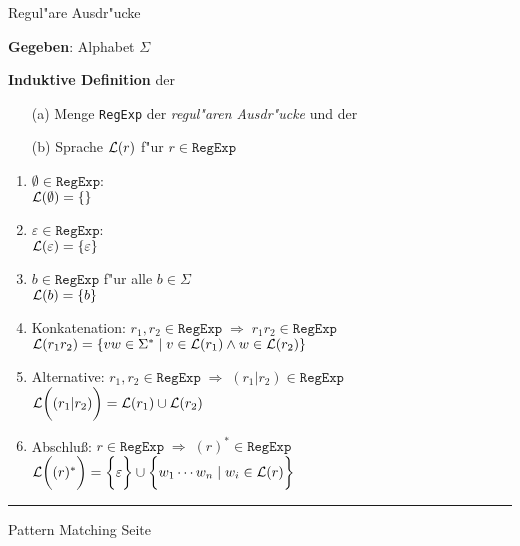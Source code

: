 
\begin{slide}{}
\normalsize

\begin{center}
Regul"are Ausdr"ucke
\end{center}
\vspace*{0.5cm}

\footnotesize
\textbf{Gegeben}: Alphabet $\Sigma$

\textbf{Induktive Definition} der 
\begin{enumerate}
\item[(a)] Menge \texttt{RegExp} der \emph{regul"aren Ausdr"ucke} und der
\item[(b)] Sprache ${\cal L}(r)$ f"ur $r \in \mathtt{RegExp}$
\end{enumerate}
\begin{enumerate}
\item $\emptyset \in \mathtt{RegExp}$: \\[0.3cm]
        \hspace*{1.3cm}  ${\cal L}(\emptyset) = \{ \}$
\item $\varepsilon \in \mathtt{RegExp}$: \\[0.3cm]
      \hspace*{1.3cm}  ${\cal L}(\varepsilon) = \{ \varepsilon \}$
\item $b \in \mathtt{RegExp}$ \quad f"ur alle $b \in \Sigma$ \\[0.3cm]
      \hspace*{1.3cm} ${\cal L}(b) = \{ b \}$
\item Konkatenation:    $r_1, r_2 \in \mathtt{RegExp}  \;\Rightarrow\; r_1r_2 \in \mathtt{RegExp}$ \\[0.3cm]
      \hspace*{1.3cm}  ${\cal L}(r_1r_2) = \{ vw \in \Sigma^* \;|\; v \in {\cal L}(r_1) \wedge w \in {\cal L}(r_2) \}$
\item Alternative: $r_1, r_2 \in \mathtt{RegExp}  \;\Rightarrow\; (r_1|r_2) \in \mathtt{RegExp}$ \\[0.3cm]
      \hspace*{1.3cm}  ${\cal L}\bigg((r_1|r_2)\bigg) = {\cal L}(r_1) \cup {\cal L}(r_2)$
\item Abschlu{\ss}: $r \in \mathtt{RegExp}   \;\Rightarrow\; (r)^* \in \mathtt{RegExp}$ \\[0.3cm]
      \hspace*{1.3cm}  ${\cal L}\bigg((r)^*\bigg) = \bigg\{ \varepsilon \bigg\} \cup \bigg\{ w_1 \cdots w_n \;|\; w_i \in {\cal L}(r) \bigg\}$
\end{enumerate}

\vspace*{\fill}
\tiny \addtocounter{mypage}{1}
\rule{17cm}{1mm}
Pattern Matching \hspace*{\fill} Seite 
\end{slide}


